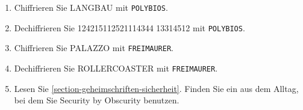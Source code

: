 \begin{enumerate}
\item Chiffrieren Sie LANGBAU mit \texttt{POLYBIOS}.
\fillwithgrid{1in}
\item Dechiffrieren Sie 124215112521114344 13314512 mit \texttt{POLYBIOS}.
\fillwithgrid{1in}
\item Chiffrieren Sie PALAZZO mit \texttt{FREIMAURER}.
\fillwithgrid{1in}
\item Dechiffrieren Sie {\pigpenfont ROLLERCOASTER} mit \texttt{FREIMAURER}.
\fillwithgrid{1in}
\item Lesen Sie \autoref{section-geheimschriften-sicherheit}. Finden Sie ein  aus dem Alltag, bei dem Sie Security by Obscurity benutzen.
\end{enumerate}